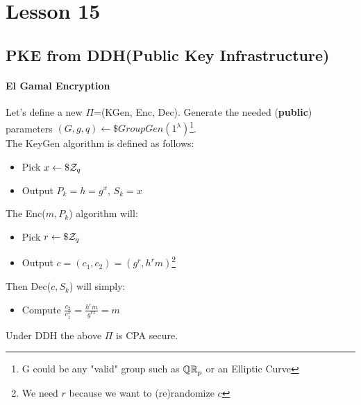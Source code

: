 \chapter*{Lesson 15}
\section{PKE from DDH(Public Key Infrastructure)}
\subsubsection{El Gamal Encryption}
Let's define a new $\Pi$=(KGen, Enc, Dec). Generate the needed (\textbf{public}) parameters $(G,g,q)\leftarrow\$GroupGen(1^{\lambda})$\footnote{G could be any "valid" group such as $\QR[p]$ or an Elliptic Curve}.\\
The KeyGen algorithm is defined as follows:
\begin{itemize}
    \item Pick $x\leftarrow\$\Z_q$
    \item Output $P_k=h=g^x$, $S_k=x$
\end{itemize}
The Enc($m,P_k$) algorithm will:
\begin{itemize}
    \item Pick $r\leftarrow\$\Z_q$
    \item Output $c=(c_1,c_2)=(g^r,h^rm)$\footnote{We need $r$ because we want to (re)randomize $c$}
\end{itemize}
Then Dec($c,S_k$) will simply:
\begin{itemize}
    \item Compute $\frac{c_2}{c_1^x}=\frac{h^r m}{g^{rx}}=m$
\end{itemize}
\begin{theorem}
    Under DDH the above $\Pi$ is CPA secure.
\end{theorem}
